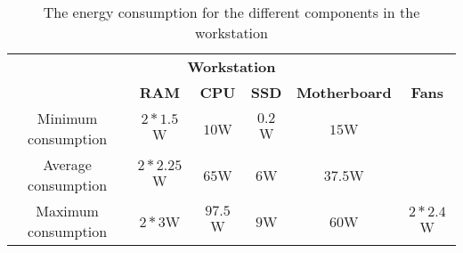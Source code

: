 \begin{table}[ht]
    \centering
    \begin{tabular}{||c | c | c | c | c | c ||}
    \hline
    \multicolumn{6}{||c||}{\textbf{Workstation}}           \\
     & \textbf{RAM}\cite{buildComputerRAM} & \textbf{CPU}\cite{IntelCPUi7} & \textbf{SSD}\cite{tomshardwareSSD} & \textbf{Motherboard}\cite{CPUPowerCum} & \textbf{Fans}\\[0.5ex] \hline\hline
    Minimum consumption & $2 * 1.5$W & $10$W   & $0.2$W & $15$W & \\
    Average consumption & $2 * 2.25$W & $65$W   & $6$W & $37.5$W & \\
    Maximum consumption & $2 * 3$W & $97.5$W & $9$W &  $60$W & $2 * 2.4$W \\ \hline
    \end{tabular}
    \caption{The energy consumption for the different components in the workstation}
    \label{tab:WorkstationEstEnergCon}    
\end{table}